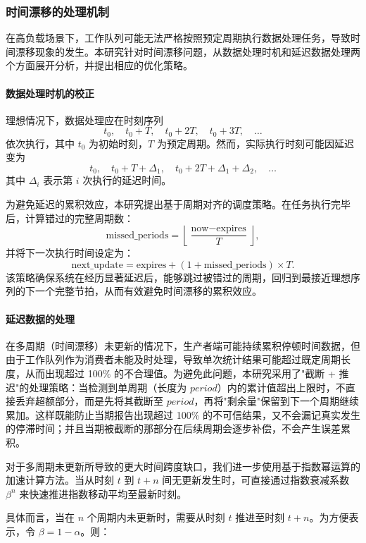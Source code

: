 \subsubsection{时间漂移的处理机制}

在高负载场景下，工作队列可能无法严格按照预定周期执行数据处理任务，导致时间漂移现象的发生。本研究针对时间漂移问题，从数据处理时机和延迟数据处理两个方面展开分析，并提出相应的优化策略。

\paragraph{数据处理时机的校正}
理想情况下，数据处理应在时刻序列
\[
t_0, \quad t_0 + T, \quad t_0 + 2T, \quad t_0 + 3T, \quad \dots
\]
依次执行，其中 \(t_0\) 为初始时刻，\(T\) 为预定周期。然而，实际执行时刻可能因延迟变为
\[
t_0, \quad t_0 + T + \Delta_1, \quad t_0 + 2T + \Delta_1 + \Delta_2, \quad \dots
\]
其中 \(\Delta_i\) 表示第 \(i\) 次执行的延迟时间。

为避免延迟的累积效应，本研究提出基于周期对齐的调度策略。在任务执行完毕后，计算错过的完整周期数：
\[
\text{missed\_periods} = \left\lfloor \frac{\text{now} - \text{expires}}{T} \right\rfloor,
\]
并将下一次执行时间设定为：
\[
\text{next\_update} = \text{expires} + (1 + \text{missed\_periods}) \times T.
\]
该策略确保系统在经历显著延迟后，能够跳过被错过的周期，回归到最接近理想序列的下一个完整节拍，从而有效避免时间漂移的累积效应。

\paragraph{延迟数据的处理}

在多周期（时间漂移）未更新的情况下，生产者端可能持续累积停顿时间数据，但由于工作队列作为消费者未能及时处理，导致单次统计结果可能超过既定周期长度，从而出现超过 100\% 的不合理值。为避免此问题，本研究采用了"截断 + 推迟"的处理策略：当检测到单周期（长度为 \(\textit{period}\)）内的累计值超出上限时，不直接丢弃超额部分，而是先将其截断至 \(\textit{period}\)，再将"剩余量"保留到下一个周期继续累加。这样既能防止当期报告出现超过 100\% 的不可信结果，又不会漏记真实发生的停滞时间；并且当期被截断的那部分在后续周期会逐步补偿，不会产生误差累积。

对于多周期未更新所导致的更大时间跨度缺口，我们进一步使用基于指数幂运算的加速计算方法。当从时刻 \(t\) 到 \(t+n\) 间无更新发生时，可直接通过指数衰减系数 \(\beta^n\) 来快速推进指数移动平均至最新时刻。

具体而言，当在 \(n\) 个周期内未更新时，需要从时刻 \(t\) 推进至时刻 \(t+n\)。为方便表示，令 \(\beta = 1-\alpha\)。则：


